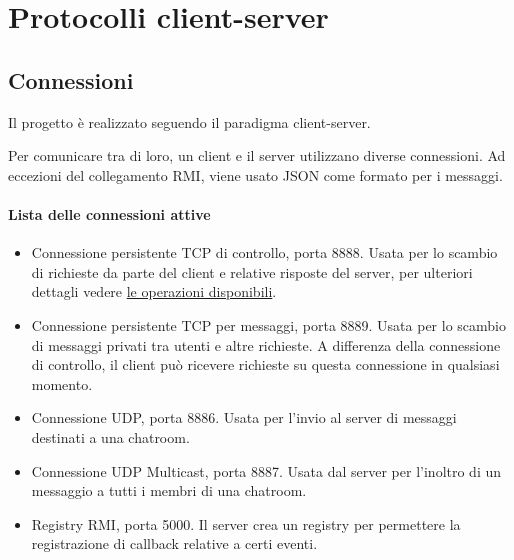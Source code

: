 \newcommand{\api}[2]{
    \begin{tabular}{m{2cm} | m{8cm}}
        \hline
    	\textbf{Richiesta} & {#1} \\
    	\hline
     	\textbf{Risposta} & {#2} \\
     	\hline
    \end{tabular}
}

\section{Protocolli client-server}

\subsection{Connessioni}

Il progetto è realizzato seguendo il paradigma client-server.

Per comunicare tra di loro, un client e il server utilizzano diverse connessioni. Ad eccezioni del collegamento RMI, viene usato JSON come formato per i messaggi.

\paragraph{Lista delle connessioni attive}
\begin{itemize}

    \item Connessione persistente TCP di controllo, porta 8888. Usata per lo scambio di richieste da parte del client e relative risposte del server, per ulteriori dettagli vedere \hyperref[ssec:operazioni]{le operazioni disponibili}.

    \item Connessione persistente TCP per messaggi, porta 8889. Usata per lo scambio di messaggi privati tra utenti e altre richieste. A differenza della connessione di controllo, il client può ricevere richieste su questa connessione in qualsiasi momento.

    \item Connessione UDP, porta 8886. Usata per l'invio al server di messaggi destinati a una chatroom.

    \item Connessione UDP Multicast, porta 8887. Usata dal server per l'inoltro di un messaggio a tutti i membri di una chatroom.

    \item Registry RMI, porta 5000. Il server crea un registry per permettere la registrazione di callback relative a certi eventi.

\end{itemize}
    
